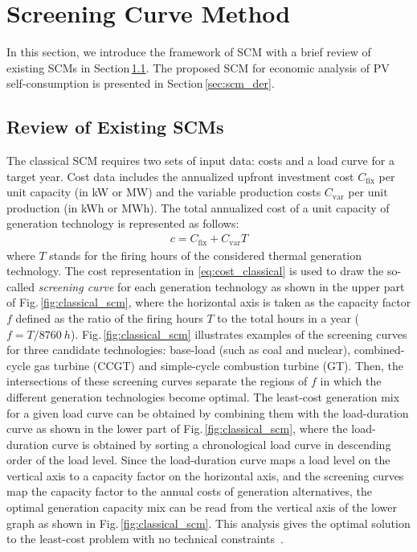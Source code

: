 \documentclass[lettersize,journal]{IEEEtran}
\newcommand{\figref}[1]{Fig.\,\ref{#1}}
\newcommand{\secref}[1]{Section\,\ref{#1}}
\begin{document}
\section{Screening Curve Method} \label{sec:scm}

In this section, we introduce the framework of SCM with a brief review of existing SCMs in \secref{sec:scm_thermal}. 
The proposed SCM for economic analysis of PV self-consumption is presented in  \secref{sec:scm_der}. 

\subsection{Review of Existing SCMs} \label{sec:scm_thermal}

%
The classical SCM \cite{phillips69,lee78} requires two sets of input data: costs and a load curve for a target year. 
Cost data includes the annualized upfront investment cost $C_\mathrm{fix}$  per unit capacity (in \si{kW} or \si{MW}) and the variable production costs $C_\mathrm{var}$ per unit production (in \si{kWh} or \si{MWh}). 
The total annualized cost of a unit capacity of generation technology is represented as follows: 
\begin{align}
 c =C_\mathrm{fix}+C_\mathrm{var} T  \label{eq:cost_classical}
\end{align}
where $T$ stands for the firing hours of the considered thermal generation technology. 
The cost representation in \eqref{eq:cost_classical} is used to draw the so-called \emph{screening curve} for each generation technology as shown in the upper part of \figref{fig:classical_scm}, where the horizontal axis is taken as the capacity factor $f$ defined as the ratio of the firing hours $T$ to the total hours in a year ($f = T/\SI{8760}{h}$). 
\figref{fig:classical_scm} illustrates examples of the screening curves for three candidate technologies: base-load (such as coal and nuclear), combined-cycle gas turbine (CCGT) and simple-cycle combustion turbine (GT).
Then, the intersections of these screening curves separate the regions of $f$ in which the different generation technologies become optimal. 
The least-cost generation mix for a given load curve can be obtained by combining them with the load-duration curve as shown in the lower part of  \figref{fig:classical_scm}, where the load-duration curve is obtained by sorting a chronological load curve in descending order of the load level. 
Since the load-duration curve maps a load level on the vertical axis to a capacity factor on the horizontal axis, and the screening curves map the capacity factor to the annual costs of generation alternatives, the optimal generation capacity mix can be read from the vertical axis of the lower graph as shown in \figref{fig:classical_scm}. 
This analysis gives the optimal solution to the least-cost problem with no technical constraints~\cite{stoft02}. 
\end{document}
